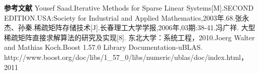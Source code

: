 \documentclass{article}
\begin{document}
\textbf{参考文献}
      \qquad
\newline
 [1]Yousef Saad.Iterative Methods for Sparse Linear Systems[M].SECOND EDITION.USA:Society for Industrial and Applied Mathematics,2003年.68.\newline
 [2]张永杰、孙秦.稀疏矩阵存储技术[J].长春理工大学学报,2006年,03期:38-41.\newline
 [3]冯广祥. 大型稀疏矩阵直接求解算法的研究及实现[8].  东北大学：系统工程，2010.\newline
 [4]Joerg Walter and Mathias Koch.Boost 1.57.0 Library Documentation-uBLAS. http://www.boost.org/doc/libs/1\_57\_0/libs/numeric/ublas/doc/index.html， 2011\newline

  
\end{document}

